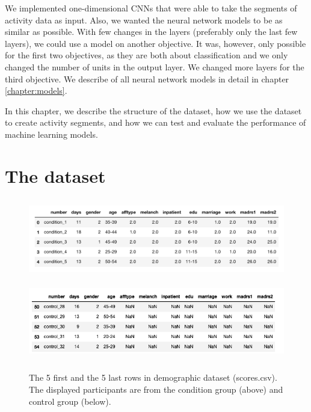 We implemented one-dimensional CNNs that were able to take the segments of activity data as input. Also, we wanted the neural network models to be as similar as possible. With few changes in the layers (preferably only the last few layers), we could use a model on another objective. It was, however, only possible for the first two objectives, as they are both about classification and we only changed the number of units in the output layer. We changed more layers for the third objective. We describe of all neural network models in detail in chapter \ref{chapter:models}.

In this chapter, we describe the structure of the dataset, how we use the dataset to create activity segments, and how we can test and evaluate the performance of machine learning models.

\section{The dataset}

\begin{figure}[!ht]
  \centering
    \includegraphics[height=3.5cm]{img/demographics.png}
    \includegraphics[height=3.5cm]{img/demographics_control.png}
    \caption{The 5 first and the 5 last rows in demographic dataset (scores.csv). The displayed participants are from the condition group (above) and control group (below).}
    \label{figure:demographics}
\end{figure}

